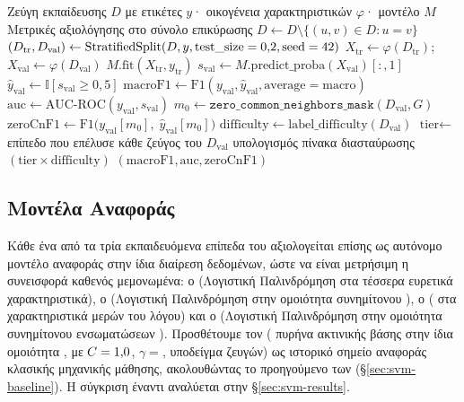 \begin{algorithm}[htbp]
\caption{Πρωτόκολλο Αξιολόγησης Μοντέλου}
\label{alg:eval-protocol}
\begin{algorithmic}[1]
\Require Ζεύγη εκπαίδευσης $D$ με ετικέτες $y$· οικογένεια χαρακτηριστικών $\varphi$·
    μοντέλο $M$
\Ensure Μετρικές αξιολόγησης στο σύνολο επικύρωσης
\State $D \gets D \setminus \{(u,v) \in D : u = v\}$ 
\State $(D_{\text{tr}}, D_{\text{val}}) \gets \text{StratifiedSplit}(D, y,
    \text{test\_size}=0{,}2{}, \text{seed}=42{})$
\State $X_{\text{tr}} \gets \varphi(D_{\text{tr}})$;\quad
    $X_{\text{val}} \gets \varphi(D_{\text{val}})$
\State $M.\text{fit}(X_{\text{tr}}, y_{\text{tr}})$
\State $s_{\text{val}} \gets M.\text{predict\_proba}(X_{\text{val}})[:,1]$
\State $\hat{y}_{\text{val}} \gets \mathbb{I}[s_{\text{val}} \geq 0{,}5]$
\State $\text{macroF1} \gets \text{F1}(y_{\text{val}}, \hat{y}_{\text{val}}, \text{average}=\text{macro})$
\State $\text{auc} \gets \text{AUC-ROC}(y_{\text{val}}, s_{\text{val}})$
\State $m_0 \gets \texttt{zero\_common\_neighbors\_mask}(D_{\text{val}}, G)$
\State $\text{zeroCnF1} \gets \text{F1}\big(y_{\text{val}}[m_0],\;
    \hat{y}_{\text{val}}[m_0]\big)$
    \State $\text{difficulty} \gets \text{label\_difficulty}(D_{\text{val}})$
    \Comment{\S\ref{sec:forensics-protocol}}
    \State $\text{tier} \gets$ επίπεδο που επέλυσε κάθε ζεύγος του $D_{\text{val}}$
    \State υπολογισμός πίνακα διασταύρωσης $(\text{tier} \times \text{difficulty})$
\EndIf
\State \Return $(\text{macroF1}, \text{auc}, \text{zeroCnF1})$
\end{algorithmic}
\end{algorithm}

\subsection{Μοντέλα Αναφοράς}
\label{subsec:baselines}

Κάθε ένα από τα τρία εκπαιδευόμενα επίπεδα του  αξιολογείται επίσης ως
αυτόνομο μοντέλο αναφοράς στην ίδια διαίρεση δεδομένων, ώστε να είναι μετρήσιμη η
συνεισφορά καθενός μεμονωμένα: ο \texttt{} (Λογιστική
Παλινδρόμηση στα τέσσερα ευρετικά χαρακτηριστικά), ο \texttt{}
(Λογιστική Παλινδρόμηση στην ομοιότητα συνημίτονου ), ο
\texttt{} ( στα χαρακτηριστικά μερών του λόγου) και ο
\texttt{} (Λογιστική Παλινδρόμηση στην ομοιότητα συνημίτονου
ενσωματώσεων ).
Προσθέτουμε τον \texttt{}
( πυρήνα ακτινικής βάσης στην ίδια ομοιότητα , με
$C=1{,}0{}$, $\gamma=$, υποδείγμα \SvmSampleSize{} ζευγών) ως ιστορικό σημείο αναφοράς
κλασικής μηχανικής μάθησης, ακολουθώντας το προηγούμενο των \textcite{alhasan2006link} (\S\ref{sec:svm-baseline}).
Η σύγκριση  έναντι
 αναλύεται στην \S\ref{sec:svm-results}.

